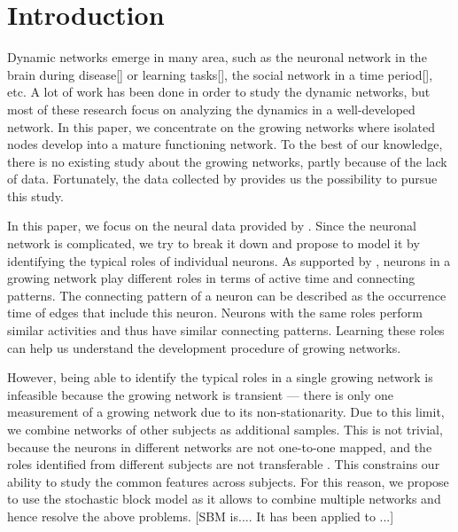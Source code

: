 

\section{Introduction}


Dynamic networks emerge in many area,
such as the neuronal network in the brain during disease[] or learning tasks[], 
the social network in a time period[], etc.
A lot of work has been done in order to study the dynamic networks,
but most of these research focus on analyzing the dynamics in a well-developed network.
In this paper, we concentrate on the growing networks where isolated nodes  develop into a mature functioning network.
To the best of our knowledge, there is no existing study about the growing networks, partly because of the lack of data.
Fortunately, the data collected by \citet{Wan2019} provides us the possibility to pursue this study.


In this paper, we focus on the neural data provided by \cite{Wan2019}.
Since the neuronal network is complicated, we try to break it down and propose to model it by identifying the typical roles of individual neurons. 
As supported by \cite{Wan2019}, neurons in a growing network play different roles in terms of active time and connecting patterns. 
The connecting pattern of a neuron can be described as the occurrence time of edges that include this neuron. 
Neurons with the same roles perform similar activities and thus have similar connecting patterns. 
Learning these roles can help us understand the development procedure of growing networks.


However, being able to identify the typical roles in a single growing network is  infeasible because 
the growing network  is transient --- 
there is only one measurement of a growing network due to its non-stationarity.
Due to this limit, we combine networks of other subjects as additional samples.
This is not trivial, because the neurons in different networks are not one-to-one mapped, 
and the roles identified from different subjects are not transferable
. 
This constrains our ability to study the common features across subjects.
For this reason, we propose to use the stochastic block model as it allows to combine multiple networks and hence resolve the above problems.
[SBM is.... It has been applied to ...]


